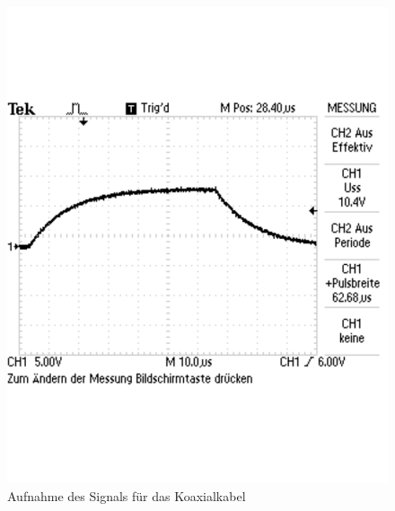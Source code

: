 \documentclass[12pt,a4paper]{article}
\begin{document}
\begin{figure}[H] 
  \centering
    \includegraphics[scale = 0.5]{5_1.pdf}
  	\caption[Aufnahme des Signals für das Koaxialkabel]{Aufnahme des Signals für das Koaxialkabel}
  \label{fig:5_1}
\end{figure}
\end{document}
